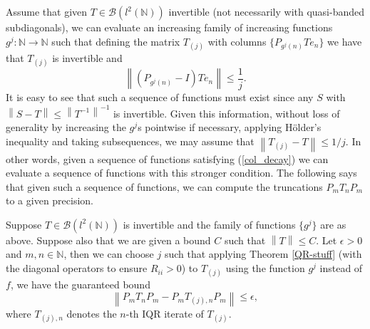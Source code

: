 \documentclass[a4paper,10pt]{article}
\begin{document}
Assume that given $T\in\mathcal{B}(l^2(\mathbb{N}))$ invertible (not necessarily with quasi-banded subdiagonals), we can evaluate an increasing family of increasing functions $g^j:\mathbb{N}\rightarrow\mathbb{N}$ such that defining the matrix $T_{(j)}$ with columns $\{P_{g^j(n)}Te_n\}$ we have that $T_{(j)}$ is invertible and
\begin{equation}
\label{col_decay}
\left\|(P_{g^j(n)}-I)Te_n\right\|\leq \frac{1}{j}.
\end{equation}
It is easy to see that such a sequence of functions must exist since any $S$ with $\left\|S-T\right\|\leq\left\|T^{-1}\right\|^{-1}$ is invertible. Given this information, without loss of generality by increasing the $g^j$s pointwise if necessary, applying H{\"o}lder's inequality and taking subsequences, we may assume that $\left\|T_{(j)}-T\right\|\leq 1/{j}.$ In other words, given a sequence of functions satisfying (\ref{col_decay}) we can evaluate a sequence of functions with this stronger condition. The following says that given such a sequence of functions, we can compute the truncations $P_mT_nP_m$ to a given precision.

\begin{theorem}
\label{can_compute_invertible}
Suppose $T\in\mathcal{B}(l^2(\mathbb{N}))$ is invertible and the family of functions $\{g^j\}$ are as above. Suppose also that we are given a bound $C$ such that $\left\|T\right\|\leq C$. Let $\epsilon>0$ and $m,n\in\mathbb{N}$, then we can choose $j$ such that applying Theorem \ref{QR-stuff} (with the diagonal operators to ensure $R_{ii}>0$) to $T_{(j)}$ using the function $g^j$ instead of $f$, we have the guaranteed bound
$$
\left\|P_mT_nP_m-P_mT_{(j),n}P_m\right\|\leq\epsilon,
$$
where $T_{(j),n}$ denotes the $n$-th IQR iterate of $T_{(j)}$.
\end{theorem}
\end{document}
